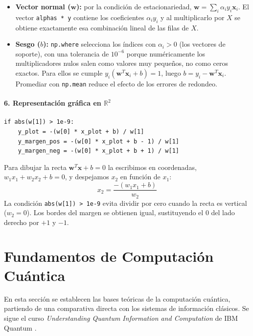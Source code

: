 \documentclass[12pt, a4paper]{article}
\begin{document}
\begin{itemize}
    \item \textbf{Vector normal ($\mathbf{w}$):} por la condición de estacionariedad, $\mathbf{w} = \sum_i \alpha_i y_i \mathbf{x}_i$. El vector \texttt{alphas * y} contiene los coeficientes $\alpha_i y_i$ y al multiplicarlo por $X$ se obtiene exactamente esa combinación lineal de las filas de $X$.
    \item \textbf{Sesgo ($b$):} \texttt{np.where} selecciona los índices con $\alpha_i > 0$ (los vectores de soporte), con una tolerancia de $10^{-6}$ porque numéricamente los multiplicadores nulos salen como valores muy pequeños, no como ceros exactos. Para ellos se cumple $y_i(\mathbf{w}^T\mathbf{x}_i + b) = 1$, luego $b = y_i - \mathbf{w}^T\mathbf{x}_i$. Promediar con \texttt{np.mean} reduce el efecto de los errores de redondeo.
\end{itemize}

\paragraph{6. Representación gráfica en $\mathbb{R}^2$}

\begin{lstlisting}
if abs(w[1]) > 1e-9:
    y_plot = -(w[0] * x_plot + b) / w[1]
    y_margen_pos = -(w[0] * x_plot + b - 1) / w[1]
    y_margen_neg = -(w[0] * x_plot + b + 1) / w[1]
\end{lstlisting}

\noindent Para dibujar la recta $\mathbf{w}^T \mathbf{x} + b = 0$ la escribimos en coordenadas, $w_1 x_1 + w_2 x_2 + b = 0$, y despejamos $x_2$ en función de $x_1$:
\[ x_2 = \frac{-(w_1 x_1 + b)}{w_2} \]
La condición \texttt{abs(w[1]) > 1e-9} evita dividir por cero cuando la recta es vertical ($w_2 = 0$). Los bordes del margen se obtienen igual, sustituyendo el $0$ del lado derecho por $+1$ y $-1$.

\newpage
\section{Fundamentos de Computación Cuántica}

\noindent En esta sección se establecen las bases teóricas de la computación cuántica, partiendo de una comparativa directa con los sistemas de información clásicos. Se sigue el curso \textit{Understanding Quantum Information and Computation} de IBM Quantum \cite{watrous2024understanding}.
\end{document}
